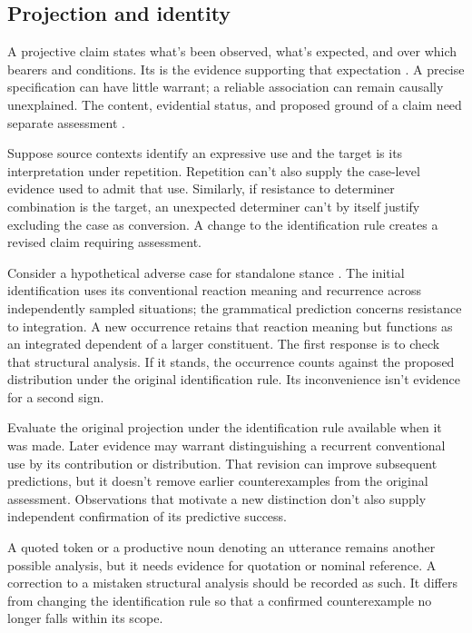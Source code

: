 \documentclass[12pt]{article}
\begin{document}
\subsection{Projection and identity}

A projective claim states what's been observed, what's expected, and
over which bearers and conditions. Its  is the evidence
supporting that expectation \citep{Goodman1955}. A precise specification
can have little warrant; a reliable association can remain causally
unexplained. The content, evidential status, and proposed ground of a
claim need separate assessment
\citep[11--12]{reynolds2026projectibilityHistory}.

Suppose source contexts identify an expressive use and the target is
its interpretation under repetition. Repetition can't also supply the
case-level evidence used to admit that use. Similarly, if resistance
to determiner combination is the target, an unexpected determiner
can't by itself justify excluding the case as conversion. A change
to the identification rule creates a revised claim requiring assessment.

Consider a hypothetical adverse case for standalone stance .
The initial identification uses its conventional reaction meaning and
recurrence across independently sampled situations; the grammatical
prediction concerns resistance to integration. A new occurrence retains
that reaction meaning but functions as an integrated dependent of a
larger constituent. The first response is to check that structural
analysis. If it stands, the occurrence counts against the proposed
distribution under the original identification rule. Its inconvenience
isn't evidence for a second sign.

Evaluate the original projection under the identification rule available
when it was made. Later evidence may warrant distinguishing a recurrent
conventional use by its contribution or distribution. That revision
can improve subsequent predictions, but it doesn't remove earlier
counterexamples from the original assessment. Observations that motivate
a new distinction don't also supply independent confirmation of its
predictive success.

A quoted token or a productive noun denoting an utterance remains
another possible analysis, but it needs evidence for quotation or
nominal reference. A correction to a mistaken structural analysis should
be recorded as such. It differs from changing the identification rule
so that a confirmed counterexample no longer falls within its scope.
\end{document}
